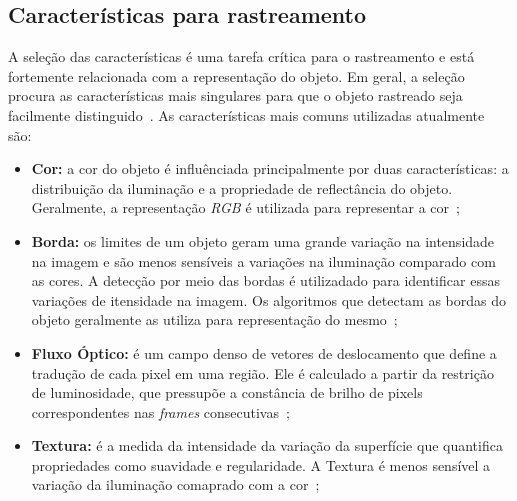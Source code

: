 
\subsection{Características para rastreamento}

	A seleção das características é uma tarefa crítica para o rastreamento e está fortemente relacionada com a representação do objeto. Em geral, a seleção procura as características mais singulares para que o objeto rastreado seja facilmente distinguido~\cite{yilmaz}. As características mais comuns utilizadas atualmente são:

	\begin{itemize}
		\item \textbf{Cor:} a cor do objeto é influênciada principalmente por duas características: a distribuição da iluminação e a propriedade de reflectância do objeto. Geralmente, a representação \textit{RGB} é utilizada para representar a cor~\cite{yilmaz};

		\item \textbf{Borda:} os limites de um objeto geram uma grande variação na intensidade na imagem e são menos sensíveis a variações na iluminação comparado com as cores. A detecção por meio das bordas é utilizadado para identificar essas variações de itensidade na imagem. Os algoritmos que detectam as bordas do objeto geralmente as utiliza para representação do mesmo~\cite{yilmaz};

		\item \textbf{Fluxo Óptico:} é um campo denso de vetores de deslocamento que define a tradução de cada pixel em uma região. Ele é calculado a partir da restrição de luminosidade, que pressupõe a constância de brilho de pixels correspondentes nas \textit{frames} consecutivas~\cite{yilmaz};

		\item \textbf{Textura:} é a medida da intensidade da variação da superfície que quantifica propriedades como suavidade e regularidade. A Textura é menos sensível a variação da iluminação comaprado com a cor~\cite{yilmaz};

	\end{itemize}

